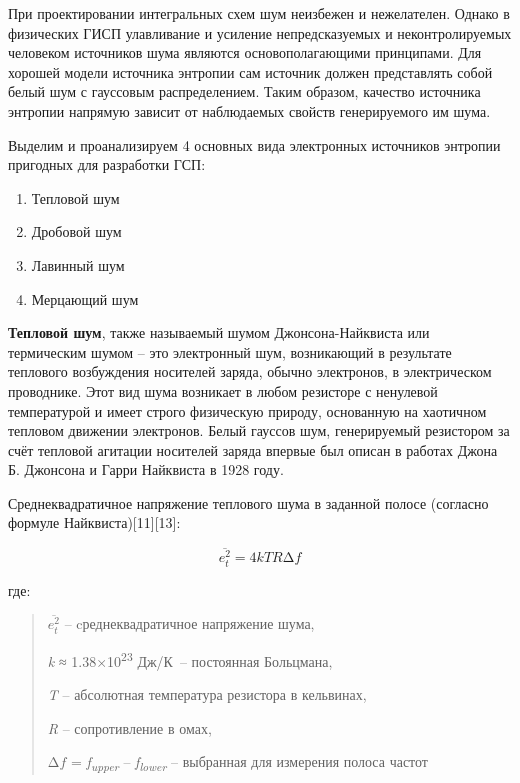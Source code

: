 \clearpage
{}


При проектировании интегральных схем шум неизбежен и нежелателен. Однако
в физических ГИСП улавливание и усиление непредсказуемых и
неконтролируемых человеком источников шума являются основополагающими
принципами. Для хорошей модели источника энтропии сам источник должен
представлять собой белый шум с гауссовым распределением. Таким образом,
качество источника энтропии напрямую зависит от наблюдаемых свойств
генерируемого им шума.

Выделим и проанализируем 4 основных вида электронных источников энтропии
пригодных для разработки ГСП:

\begin{enumerate}
\def\labelenumi{\arabic{enumi}.}
\item
  Тепловой шум
\item
  Дробовой шум
\item
  Лавинный шум
\item
  Мерцающий шум
\end{enumerate}

\textbf{Тепловой шум}, также называемый шумом Джонсона-Найквиста или
термическим шумом -- это электронный шум, возникающий в результате
теплового возбуждения носителей заряда, обычно электронов, в
электрическом проводнике. Этот вид шума возникает в любом резисторе с
ненулевой температурой и имеет строго физическую природу, основанную на
хаотичном тепловом движении электронов. Белый гауссов шум, генерируемый
резистором за счёт тепловой агитации носителей заряда впервые был описан
в работах Джона Б. Джонсона и Гарри Найквиста в 1928 году.

Среднеквадратичное напряжение теплового шума в заданной полосе (согласно
формуле Найквиста){[}11{]}{[}13{]}:

\[\overline{e_{t}^{2}} = 4kTR\mathrm{\Delta}f\]

где:

\begin{quote}
\(\overline{e_{t}^{2}}\) -- cреднеквадратичное напряжение шума,

\emph{k} ≈ 1.38×10\textsuperscript{23} Дж/К~-- постоянная Больцмана,

\emph{T} -- абсолютная температура резистора в кельвинах,

\emph{R} -- сопротивление в омах,

\(\mathrm{\Delta}f\) = \emph{f\textsubscript{upper}} --
\emph{f\textsubscript{lower }}-- выбранная для измерения полоса частот
\end{quote}

